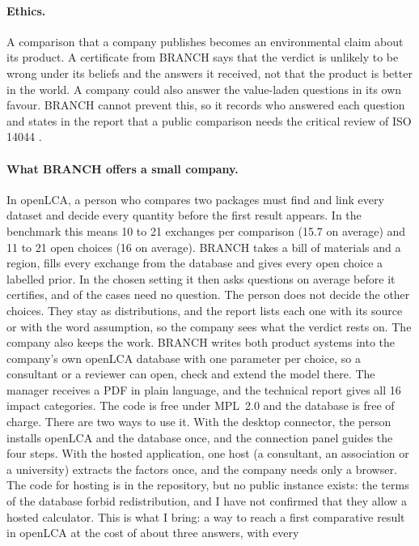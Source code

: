 \documentclass{article}
\begin{document}
\paragraph{Ethics.}
A comparison that a company publishes becomes an environmental claim about its product. A certificate from
BRANCH says that the verdict is unlikely to be wrong under its beliefs and the answers it received, not
that the product is better in the world. A company could also answer the value-laden questions in its own
favour. BRANCH cannot prevent this, so it records who answered each question and states in the report that
a public comparison needs the critical review of ISO 14044 \citep{iso14044}.

\paragraph{What BRANCH offers a small company.}
In openLCA, a person who compares two packages must find and link every dataset and decide every quantity
before the first result appears. In the benchmark this means 10 to 21 exchanges per comparison (15.7 on
average) and 11 to 21 open choices (16 on average). BRANCH takes a bill of materials and a region, fills
every exchange from the database and gives every open choice a labelled prior. In the chosen setting it
then asks \qFlipChosen{} questions on average before it certifies, and \nNoQStrict{} of the \nCases{}
cases need no question. The person does not decide the other choices. They stay as distributions, and the
report lists each one with its source or with the word assumption, so the company sees what the verdict
rests on. The company also keeps the work. BRANCH writes both product systems into the company's own
openLCA database with one parameter per choice, so a consultant or a reviewer can open, check and extend
the model there. The manager receives a PDF in plain language, and the technical report gives all 16
impact categories. The code is free under MPL~2.0 and the database is free of charge. There are two ways to use it. With the desktop connector, the person installs openLCA and the database once, and the connection panel
guides the four steps. With the hosted application, one host (a consultant, an association or a university) extracts the factors once, and the
company needs only a browser. The code for hosting is in the repository, but no public instance exists: the terms of the database forbid redistribution,
and I have not confirmed that they allow a hosted calculator. This is what I
bring: a way to reach a first comparative result in openLCA at the cost of about three answers, with every
\end{document}
